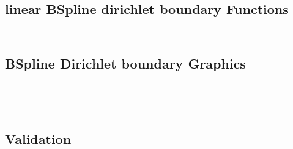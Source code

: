 \documentclass{article}
\begin{document}
 \begin{landscape}
 \subsection{linear BSpline dirichlet boundary Functions}
 \begin{eqnarray*}
 \\ 
\end{eqnarray*}
\end{landscape}
\begin{landscape}
\subsection{BSpline Dirichlet boundary Graphics}
\begin{tabular}{}
\end{tabular} 
 \\ 
\begin{tabular}{}
\end{tabular} 
 \end{landscape}
 \begin{landscape}
 \subsection{Validation}\end{landscape} 
\end{document}
